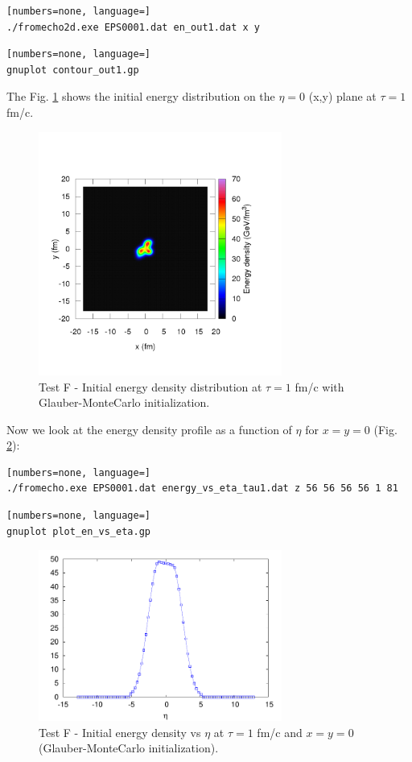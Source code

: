 \begin{lstlisting}[numbers=none, language=]
./fromecho2d.exe EPS0001.dat en_out1.dat x y
\end{lstlisting}
\begin{lstlisting}[numbers=none, language=]
gnuplot contour_out1.gp
\end{lstlisting}
The Fig. \ref{fig:endens-gmc1} shows the initial energy distribution on the $\eta=0$ (x,y) plane at $\tau=1$ fm/c.
\begin{figure}[!h]
 \begin{center}
  \includegraphics[width=8cm]{images/gmc_energy_density_contour_at_eta_0_tau1.png}
   \caption{Test F - Initial energy density distribution at $\tau=1$ fm/c with Glauber-MonteCarlo initialization.}
    \label{fig:endens-gmc1}
 \end{center}
\end{figure}
Now we look at the energy density profile as a function of $\eta$ for $x=y=0$ (Fig. \ref{fig:endens-gmc3}):
\begin{lstlisting}[numbers=none, language=]
./fromecho.exe EPS0001.dat energy_vs_eta_tau1.dat z 56 56 56 56 1 81
\end{lstlisting}
\begin{lstlisting}[numbers=none, language=]
gnuplot plot_en_vs_eta.gp
\end{lstlisting}
\begin{figure}[!h]
 \begin{center}
  \includegraphics[width=8cm]{images/plot_en_vs_eta.pdf}
   \caption{Test F - Initial energy density vs $\eta$ at $\tau=1$ fm/c and $x=y=0$ (Glauber-MonteCarlo initialization).}
    \label{fig:endens-gmc3}
 \end{center}
\end{figure}
